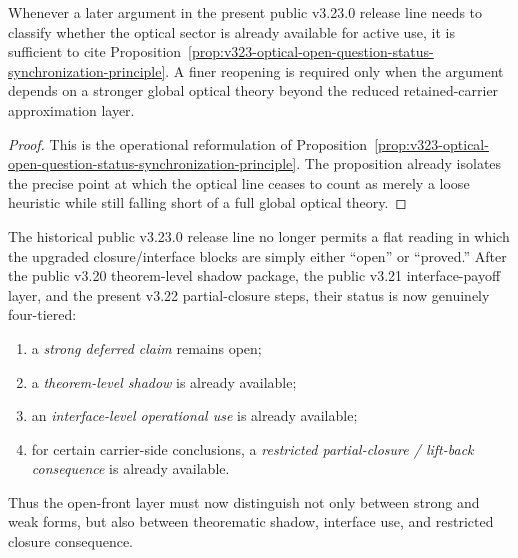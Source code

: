 \begin{corollary}
\label{cor:use-rule-for-the-synchronized-v323-optical-status-reading}
Whenever a later argument in the present public v3.23.0 release line needs to classify whether the optical sector is already available for active use, it is sufficient to cite Proposition~\ref{prop:v323-optical-open-question-status-synchronization-principle}. A finer reopening is required only when the argument depends on a stronger global optical theory beyond the reduced retained-carrier approximation layer.
\end{corollary}

\begin{proof}
This is the operational reformulation of Proposition~\ref{prop:v323-optical-open-question-status-synchronization-principle}. The proposition already isolates the precise point at which the optical line ceases to count as merely a loose heuristic while still falling short of a full global optical theory.
\end{proof}


\begin{remark}
\label{rem:v322-synchronized-status-reading-upgraded-closure-layer}
The historical public v3.23.0 release line no longer permits a flat reading in which the upgraded closure/interface blocks are simply either ``open'' or ``proved.'' After the public v3.20 theorem-level shadow package, the public v3.21 interface-payoff layer, and the present v3.22 partial-closure steps, their status is now genuinely four-tiered:
\begin{enumerate}[leftmargin=2em,label=(\roman*)]
  \item a \emph{strong deferred claim} remains open;
  \item a \emph{theorem-level shadow} is already available;
  \item an \emph{interface-level operational use} is already available;
  \item for certain carrier-side conclusions, a \emph{restricted partial-closure / lift-back consequence} is already available.
\end{enumerate}
Thus the open-front layer must now distinguish not only between strong and weak forms, but also between theorematic shadow, interface use, and restricted closure consequence.
\end{remark}


